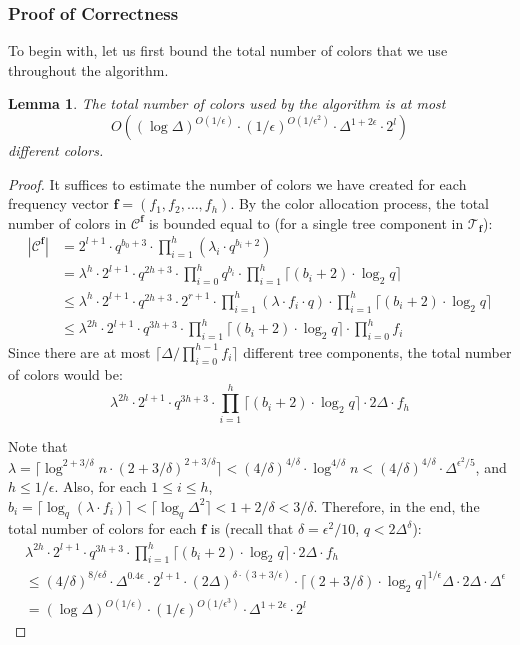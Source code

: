 \documentclass[11pt,a4paper]{article}
\newtheorem{lemma}{Lemma}[section]
\newcommand{\ceil}[1]{\lceil #1 \rceil}
\newcommand{\tree}{\mathcal{T}}
\newcommand{\freq}{\mathbf{f}}
\newcommand{\clr}{\mathcal{C}}
\newcommand{\brac}[1]{\left(#1\right)}
\begin{document}
\subsubsection{Proof of Correctness}
To begin with, let us first bound the total number of colors that we use throughout the algorithm.
\begin{lemma}
	The total number of colors used by the algorithm is at most $$O\brac{(\log\Delta)^{O(1 / \epsilon)}\cdot(1/\epsilon)^{O(1/\epsilon^2)}\cdot \Delta^{1+2\epsilon}\cdot 2^l}$$ different colors.
\end{lemma}
\begin{proof}
	It suffices to estimate the number of colors we have created for each frequency vector $\freq = (f_1, f_2, \ldots, f_h)$. By the color allocation process, the total number of colors in $\clr^\freq$ is bounded equal to (for a single tree component in $\tree_{\freq}$):
	$$\begin{aligned}
		|\clr^\freq| &= 2^{l+1}\cdot q^{b_0+3}\cdot\prod_{i=1}^h(\lambda_i\cdot q^{b_i+2})\\
		&= \lambda^{h}\cdot 2^{l+1}\cdot q^{2h+3}\cdot\prod_{i=0}^h q^{b_i}\cdot \prod_{i=1}^h \ceil{(b_i+2)\cdot \log_2q}\\
		&\leq \lambda^{h}\cdot 2^{l+1}\cdot q^{2h+3}\cdot 2^{r+1}\cdot\prod_{i=1}^h (\lambda\cdot f_i\cdot q)\cdot \prod_{i=1}^h \ceil{(b_i+2)\cdot \log_2q}\\
		&\leq \lambda^{2h}\cdot 2^{l+1}\cdot q^{3h+3}\cdot \prod_{i=1}^h \ceil{(b_i+2)\cdot \log_2q} \cdot \prod_{i=0}^h f_i
	\end{aligned}$$
	Since there are at most $\ceil{\Delta / \prod_{i=0}^{h - 1}f_i}$ different tree components, the total number of colors would be:
	$$\lambda^{2h}\cdot 2^{l+1}\cdot q^{3h+3}\cdot \prod_{i=1}^h \ceil{(b_i+2)\cdot \log_2q} \cdot 2\Delta \cdot f_h$$
	
	Note that $\lambda = \ceil{\log^{2+3/\delta}n\cdot (2 + 3/\delta)^{2+3/\delta}} < (4/\delta)^{4/\delta} \cdot \log^{4/\delta} n < (4/\delta)^{4/\delta}\cdot \Delta^{\epsilon^2 / 5}$, and $h\leq 1/\epsilon$. Also, for each $1\leq i\leq h$, $b_i = \ceil{\log_q(\lambda\cdot f_i)} < \ceil{\log_q \Delta^2} < 1 + 2/\delta < 3/\delta$. Therefore, in the end, the total number of colors for each $\freq$ is (recall that $\delta = \epsilon^2/10$, $q < 2\Delta^{\delta}$):
	$$\begin{aligned}
		&\lambda^{2h}\cdot 2^{l+1}\cdot q^{3h+3}\cdot \prod_{i=1}^h \ceil{(b_i+2)\cdot \log_2q}\cdot 2\Delta\cdot f_h\\
		&\leq (4/\delta)^{8/\epsilon \delta}\cdot \Delta^{0.4\epsilon}\cdot 2^{l+1}\cdot (2\Delta)^{\delta \cdot (3 + 3/\epsilon)} \cdot \ceil{(2+3/\delta)\cdot \log_2 q}^{1/\epsilon}\Delta\cdot 2\Delta \cdot \Delta^{\epsilon}\\
		&= (\log\Delta)^{O(1 / \epsilon)}\cdot(1/\epsilon)^{O(1/\epsilon^3)}\cdot \Delta^{1+2\epsilon}\cdot 2^l
	\end{aligned}$$
\end{proof}
\end{document}
